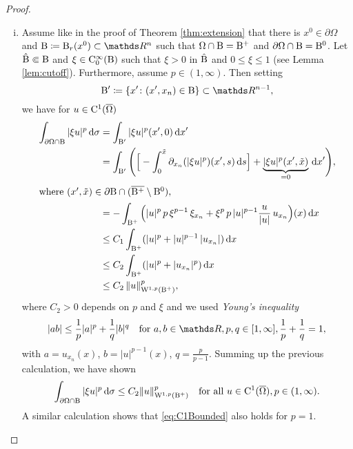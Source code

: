 \begin{proof}
  \begin{enumerate}[i)]
    \item Assume like in the proof of Theorem \ref{thm:extension} that there is $x^0 \in \partial \Omega$ and $\BB \coloneqq \BB_r(x^0) \subset \R^n$ such that $\Omega \cap \mathrm{B} = \mathrm{B}^+$ and $\partial\Omega \cap \mathrm{B} = \mathrm{B}^0$.
  Let $\hat {\mathrm{B}} \Subset \mathrm{B}$ and $\xi \in \mathrm{C}_0^\infty(\mathrm{B})$ such that $\xi > 0$ in $\hat{\mathrm{B}}$ and $0 \leq \xi \leq 1$ (see Lemma \ref{lem:cutoff}).
  Furthermore, assume $p \in (1,\infty)$.
  Then setting
  $$
  \BB' \coloneqq \{ x' \colon (x', x_n) \in \BB \} \subset \R^{n - 1},
  $$
  we have for $u \in \mathrm{C}^1(\overline\Omega)$
  \begin{align*}
    \int_{\partial\Omega \cap \mathrm{B}} |\xi u|^p \, {\operatorname{d}\!{\sigma}} 
    &= \int_{\mathrm{B}'} |\xi u|^p(x', 0) \, {\operatorname{d}\!{x}}' \nonumber\\
    &= \int_{\mathrm{B}'} \Bigg( \Big[ - \int_0^{\tilde x} \partial_{x_n} (|\xi u|^p)(x',s) \, {\operatorname{d}\!{s}} \Big] + \underbrace{|\xi u|^p (x', \tilde x)}_{= 0} \, {\operatorname{d}\!{x}}' \Bigg),\nonumber\\
    \intertext{where $(x',\tilde x) \in \partial \mathrm{B} \cap (\overline{\mathrm{B}^+} \setminus \mathrm{B}^0)$,}
    &= -\int_{\mathrm{B}^+} \Big( |u|^p \, p \, \xi^{p - 1} \, \xi_{x_n} + \xi^p \, p \, |u|^{p - 1} \frac{u}{|u|} \, u_{x_n} \Big)(x) \, {\operatorname{d}\!{x}} \nonumber\\ 
    &\leq C_1 \int_{\mathrm{B}^+} (|u|^p + |u|^{p-1} \, |u_{x_n}| ) \, {\operatorname{d}\!{x}} \\
    &\leq C_2 \int_{\mathrm{B}^+} (|u|^p + |u_{x_n}|^p ) \, {\operatorname{d}\!{x}} \\
    &\leq C_2 \, \| u\|_{\mathrm{W}^{1,p}(\mathrm{B}^+)}^p,
  \end{align*}
      where $C_2 > 0 $ depends on $p$ and $\xi$ and we used \emph{Young's inequality}
    $$
    |a b | \leq \frac{1}{p} |a|^p + \frac{1}{q} |b|^q \quad\text{for } a,b \in \R, p,q \in [1,\infty], \frac{1}{p} + \frac{1}{q} = 1,
    $$
    with $a = u_{x_n}(x)$, $b = |u|^{p - 1}(x)$, $q = \frac{p}{p - 1}$.
    Summing up the previous calculation, we have shown
    \begin{equation}
      \label{eq:C1Bounded}
      \int_{\partial\Omega \cap \mathrm{B}} |\xi u|^p \, {\operatorname{d}\!{\sigma}} 
      \leq C_2 \| u\|_{\mathrm{W}^{1,p}(\mathrm{B}^+)}^p \quad\text{for all } u \in \mathrm{C}^1(\overline\Omega), p \in (1,\infty).
    \end{equation}
    A similar calculation shows that \eqref{eq:C1Bounded} also holds for $p = 1$.


\end{enumerate}
\end{proof}
